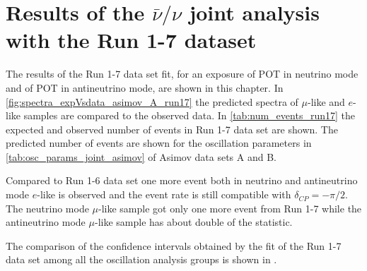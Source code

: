 
\clearpage

\section {Results of the $\bar{\nu}/\nu$ joint analysis with the Run 1-7 dataset}
\label{sec:results_run17}

The results of the Run 1-7 data set fit,
for an exposure 
of \TotalPotNuRunOneSeven POT in neutrino mode
and
of \TotalPotNuBarRunOneSeven POT in antineutrino mode, 
are shown in this chapter.
In \cref{fig:spectra_expVsdata_asimov_A_run17} the predicted spectra of $\mu$-like and $e$-like samples
are compared to the observed data.
In \cref{tab:num_events_run17} the expected and observed number of events in Run 1-7 data set are shown.
The predicted number of events are shown for the oscillation parameters in \cref{tab:osc_params_joint_asimov}
of Asimov data sets A and B.

Compared to Run 1-6 data set one more event both in neutrino and antineutrino mode $e$-like is observed
and the event rate is still compatible with $\delta_{CP} = -\pi/2$.
The neutrino mode $\mu$-like sample got only one more event from Run 1-7
while the antineutrino mode $\mu$-like sample has about double of the statistic.

The comparison of the confidence intervals obtained by the fit of the Run 1-7 data set
among all the oscillation analysis groups is shown in \cite{Mach3JointFitRun16}.


